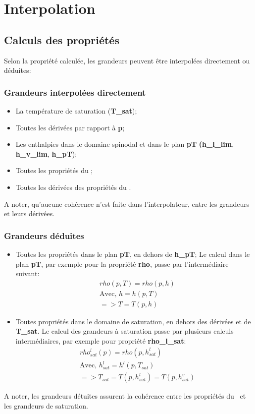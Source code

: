    
   \section{Interpolation}
   
    \subsection{Calculs des propriétés}
    
    Selon la propriété calculée, les grandeurs peuvent être interpolées directement ou déduites:
    
    \subsubsection{Grandeurs interpolées directement}
    \begin{itemize}
      \item La température de saturation (\textbf{T\_sat});
      \item Toutes les dérivées par rapport à \textbf{p};
      \item Les enthalpies dans le domaine spinodal et dans le plan \textbf{pT} \textbf{(h\_l\_lim}, \textbf{h\_v\_lim}, \textbf{h\_pT});
      \item Toutes les propriétés du \pph;
      \item Toutes les dérivées des propriétés du \pph.
    \end{itemize}
    A noter, qu'aucune cohérence n'est faite dans l'interpolateur, entre les grandeurs et leurs dérivées.
    
    \subsubsection{Grandeurs déduites}
    \begin{itemize}
      \item Toutes les propriétés dans le plan \textbf{pT}, en dehors de \textbf{h\_pT};
      \subitem Le calcul dans le plan \textbf{pT}, par exemple pour la propriété \textbf{rho}, passe par l'intermédiaire suivant:
      \begin{align*}
      &rho(p,T) = rho(p,h)\\
      &\text{Avec, } h = h(p,T)\\
      &=> T = T(p,h)
      \end{align*}
      
      \item Toutes propriétés dans le domaine de saturation, en dehors des dérivées et de \textbf{T\_sat}.
      \subitem Le calcul des grandeurs à saturation passe par plusieurs calculs intermédiaires, par exemple pour propriété \textbf{rho\_l\_sat}:\\
       \begin{align*}
	&rho^l_{sat}(p) = rho(p,h^l_{sat})\\
	&\text{Avec, } h^l_{sat} = h^l(p,T_{sat})\\
	&=> T_{sat} = T(p,h^l_{sat}) = T(p,h^v_{sat})
       \end{align*}
    \end{itemize}
    A noter, les grandeurs détuites assurent la cohérence entre les propriétés du \pph\ et les grandeurs de saturation.

